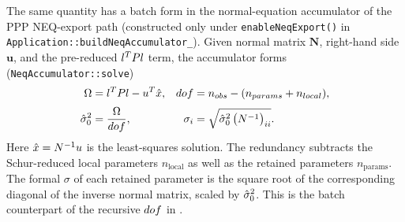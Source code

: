 \documentclass[main.tex]{subfiles}
\begin{document}
The same quantity has a batch form in the normal-equation accumulator
of the PPP NEQ-export path (constructed only under \texttt{enableNeqExport()}
in \texttt{Application::buildNeqAccumulator\_}).  Given normal matrix $\bm{N}$,
right-hand side $\bm{u}$, and the pre-reduced $l^{T}Pl$ term,
the accumulator forms (\texttt{NeqAccumulator::solve})
\begin{align}
\Omega &= l^{T}Pl - u^{T}\hat{x},
&
dof &= n_{obs} - (n_{params} + n_{local}),
\label{eq:qc-neq-wssr}\\[2pt]
\hat{\sigma}^2_0 &= \frac{\Omega}{dof},
&
\sigma_i &= \sqrt{\hat{\sigma}^2_0\,\bigl(N^{-1}\bigr)_{ii}} .
\label{eq:qc-neq-sigma}
\end{align}
Here $\hat{x} = N^{-1}u$ is the least-squares solution.
The redundancy subtracts the Schur-reduced local parameters
$n_{\mathrm{local}}$ as well as the retained parameters
$n_{\mathrm{params}}$.  The formal $\sigma$ of each retained parameter is
the square root of the corresponding diagonal of the inverse normal
matrix, scaled by $\hat{\sigma}^2_0$.  This is the batch counterpart of the
recursive $dof$ in .
\end{document}
